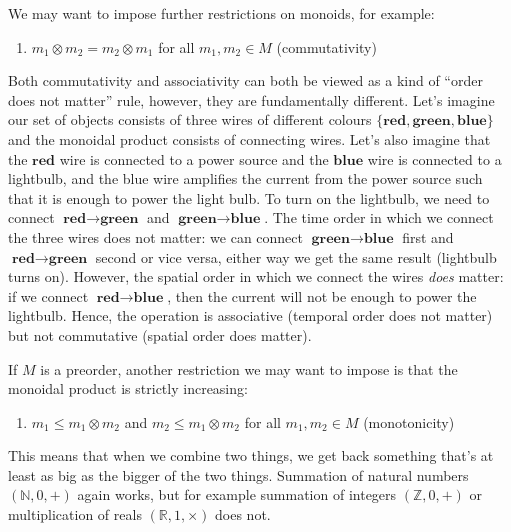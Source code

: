 \documentclass[
]{book}
\providecommand{\tightlist}{%
  \setlength{\itemsep}{0pt}\setlength{\parskip}{0pt}}
\theoremstyle{definition}
\theoremstyle{definition}
\theoremstyle{definition}
\theoremstyle{definition}
\theoremstyle{remark}
\begin{document}
We may want to impose further restrictions on monoids, for example:

\begin{enumerate}
\def\labelenumi{\arabic{enumi}.}
\setcounter{enumi}{2}
\tightlist
\item
  \(m_1 \otimes m_2 = m_2 \otimes m_1\) for all \(m_1, m_2 \in M\) (commutativity)
\end{enumerate}

Both commutativity and associativity can both be viewed as a kind of ``order does not matter'' rule, however, they are fundamentally different. Let's imagine our set of objects consists of three wires of different colours \(\{ \textbf{red}, \textbf{green}, \textbf{blue} \}\) and the monoidal product consists of connecting wires. Let's also imagine that the \(\textbf{red}\) wire is connected to a power source and the \(\textbf{blue}\) wire is connected to a lightbulb, and the blue wire amplifies the current from the power source such that it is enough to power the light bulb. To turn on the lightbulb, we need to connect \(\textbf{red} \to \textbf{green}\) and \(\textbf{green} \to \textbf{blue}\). The time order in which we connect the three wires does not matter: we can connect \(\textbf{green} \to \textbf{blue}\) first and \(\textbf{red} \to \textbf{green}\) second or vice versa, either way we get the same result (lightbulb turns on). However, the spatial order in which we connect the wires \emph{does} matter: if we connect \(\textbf{red} \to \textbf{blue}\), then the current will not be enough to power the lightbulb. Hence, the operation is associative (temporal order does not matter) but not commutative (spatial order does matter).

If \(M\) is a preorder, another restriction we may want to impose is that the monoidal product is strictly increasing:

\begin{enumerate}
\def\labelenumi{\arabic{enumi}.}
\setcounter{enumi}{3}
\tightlist
\item
  \(m_1 \leq m_1 \otimes m_2\) and \(m_2 \leq m_1 \otimes m_2\) for all \(m_1, m_2 \in M\) (monotonicity)
\end{enumerate}

This means that when we combine two things, we get back something that's at least as big as the bigger of the two things. Summation of natural numbers \((\mathbb{N}, 0, +)\) again works, but for example summation of integers \((\mathbb{Z}, 0, +)\) or multiplication of reals \((\mathbb{R}, 1, \times)\) does not.
\end{document}
